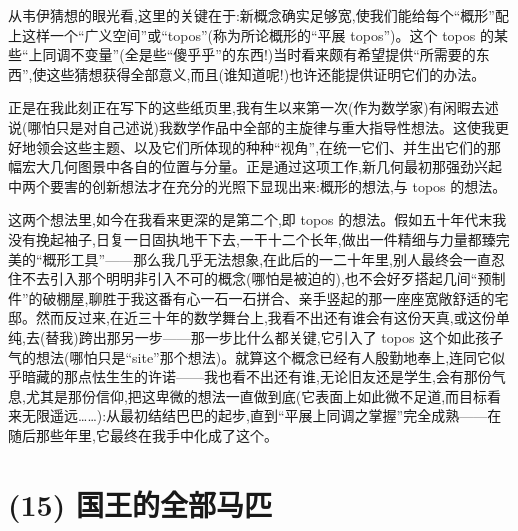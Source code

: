 从韦伊猜想的眼光看,这里的关键在于:新概念确实足够宽,使我们能给每个“概形”配上这样一个“广义空间”或“topos”(称为所论概形的“平展 topos”)。这个 topos 的某些“上同调不变量”(全是些“傻乎乎”的东西!)当时看来颇有希望提供“所需要的东西”,使这些猜想获得全部意义,而且(谁知道呢!)也许还能提供证明它们的办法。

正是在我此刻正在写下的这些纸页里,我有生以来第一次(作为数学家)有闲暇去述说(哪怕只是对自己述说)我数学作品中全部的主旋律与重大指导性想法。这使我更好地领会这些主题、以及它们所体现的种种“视角”,在统一它们、并生出它们的那幅宏大几何图景中各自的位置与分量。正是通过这项工作,新几何最初那强劲兴起中两个要害的创新想法才在充分的光照下显现出来:概形的想法,与 topos 的想法。

这两个想法里,如今在我看来更深的是第二个,即 topos 的想法。假如五十年代末我没有挽起袖子,日复一日固执地干下去,一干十二个长年,做出一件精细与力量都臻完美的“概形工具”——那么我几乎无法想象,在此后的一二十年里,别人最终会一直忍住不去引入那个明明非引入不可的概念(哪怕是被迫的),也不会好歹搭起几间“预制件”的破棚屋,聊胜于我这番有心一石一石拼合、亲手竖起的那一座座宽敞舒适的宅邸。然而反过来,在近三十年的数学舞台上,我看不出还有谁会有这份天真,或这份单纯,去(替我)跨出那另一步——那一步比什么都关键,它引入了 topos 这个如此孩子气的想法(哪怕只是“site”那个想法)。就算这个概念已经有人殷勤地奉上,连同它似乎暗藏的那点怯生生的许诺——我也看不出还有谁,无论旧友还是学生,会有那份气息,尤其是那份信仰,把这卑微的想法一直做到底(它表面上如此微不足道,而目标看来无限遥远……):从最初结结巴巴的起步,直到“平展上同调之掌握”完全成熟——在随后那些年里,它最终在我手中化成了这个。

\section{(15) 国王的全部马匹}

